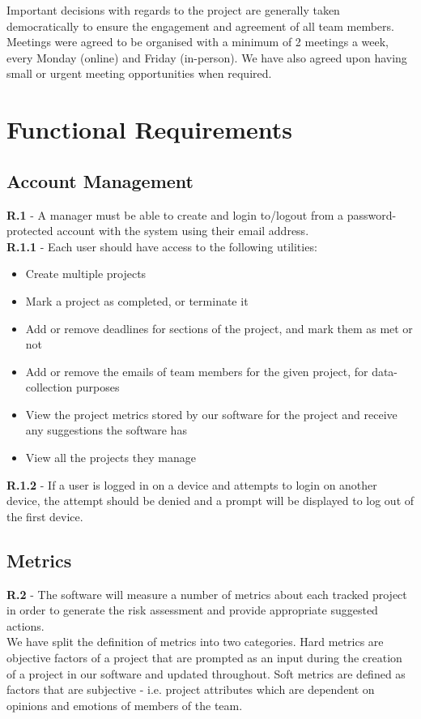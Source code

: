 \documentclass[a4paper]{article}
\theoremstyle{plain}
\theoremstyle{definition}
\theoremstyle{remark}
\begin{document}
\noindent Important decisions with regards to the project are generally taken democratically to ensure the engagement and agreement of all team members. Meetings were agreed to be organised with a minimum of 2 meetings a week, every Monday (online) and Friday (in-person). We have also agreed upon having small or urgent meeting opportunities when required.
\section*{Functional Requirements}
\subsection*{Account Management}
\textbf{R.1} - A manager must be able to create and login to/logout from a password-protected account with the system using their email address.\\

	\textbf{R.1.1} - Each user should have access to the following utilities:
\begin{itemize}
	\item Create multiple projects
	\item Mark a project as completed, or terminate it
	\item Add or remove deadlines for sections of the project, and mark them as met or not
	\item Add or remove the emails of team members for the given project, for data-collection purposes
	\item View the project metrics stored by our software for the project and receive any suggestions the software has
	\item View all the projects they manage
\end{itemize}
\par\textbf{R.1.2} - If a user is logged in on a device and attempts to login on another device, the attempt should be denied and a prompt will be displayed to log out of the first device.
\subsection*{Metrics}
\textbf{R.2} - The software will measure a number of metrics about each tracked project in order to generate the risk assessment and provide appropriate suggested actions. \\

\noindent We have split the definition of metrics into two categories. Hard metrics are objective factors of a project that are prompted as an input during the creation of a project in our software and updated throughout. Soft metrics are defined as factors that are subjective - i.e. project attributes which are dependent on opinions and emotions of members of the team.\\
\end{document}
